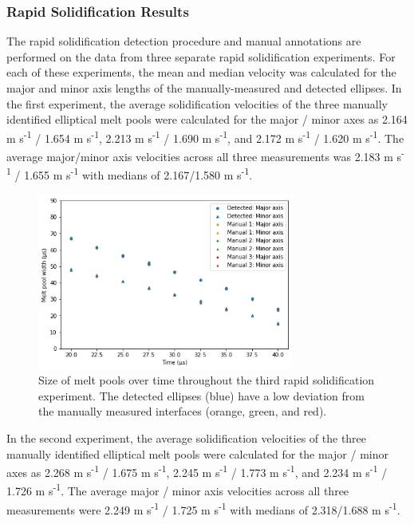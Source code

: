 \subsubsection{Rapid Solidification Results}
The rapid solidification detection procedure and manual annotations are
performed on the data from three separate rapid solidification experiments.
For each of these
experiments, the mean and median velocity was calculated
for the major and minor axis lengths of the manually-measured and detected
ellipses.
In the first experiment, the average solidification velocities of the
three manually identified elliptical melt pools were calculated for the
major / minor axes as 2.164
m s\textsuperscript{-1} / 1.654 m s\textsuperscript{-1},
2.213 m s\textsuperscript{-1} / 1.690 m s\textsuperscript{-1}, and
2.172 m s\textsuperscript{-1} / 1.620 m s\textsuperscript{-1}. The
average major/minor axis velocities across all three measurements was
2.183 m s\textsuperscript{-1} / 1.655 m s\textsuperscript{-1} with medians of
2.167/1.580 m s\textsuperscript{-1}.

\begin{figure}[ht]
    \centering
    \includegraphics[width=0.75\textwidth]{figures/04/15-detected-vs-manual-03.png}
    \caption{
        \small{}
        Size of melt pools over time throughout the third rapid
        solidification experiment. The detected ellipses (blue) have a
        low deviation from the manually measured interfaces
        (orange, green, and red).
    }
    \label{fig/detected-dtem-1}
\end{figure}

In the second experiment, the average solidification velocities of the
three manually identified elliptical melt pools were calculated for the
major / minor axes as
2.268 m s\textsuperscript{-1} / 1.675 m s\textsuperscript{-1},
2.245 m s\textsuperscript{-1} / 1.773 m s\textsuperscript{-1}, and
2.234 m s\textsuperscript{-1} / 1.726 m s\textsuperscript{-1}. The
average major / minor axis velocities across all three measurements were
2.249 m s\textsuperscript{-1} / 1.725 m s\textsuperscript{-1} with medians
of 2.318/1.688 m s\textsuperscript{-1}.

